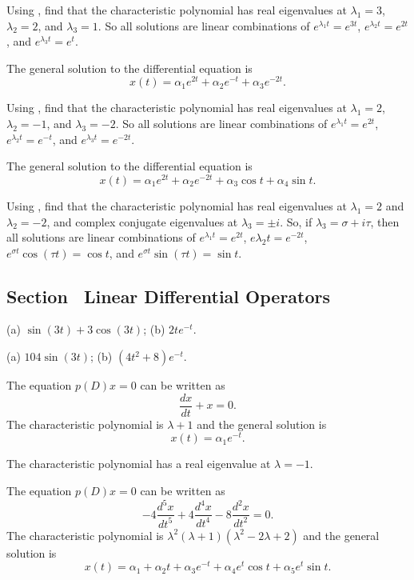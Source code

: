 \documentclass{ximera}
\begin{document}
\soln Using \Matlab, find that the characteristic polynomial has real
eigenvalues at $\lambda_1 = 3$, $\lambda_2 = 2$, and $\lambda_3 = 1$.  So
all solutions are linear combinations of $e^{\lambda_1 t} = e^{3t}$,
$e^{\lambda_2 t} = e^{2t}$, and $e^{\lambda_3 t} = e^t$.

 \ans The general solution to the differential equation is
\[
x(t) = \alpha_1e^{2t} + \alpha_2e^{-t} + \alpha_3e^{-2t}.
\]

\soln Using \Matlab, find that the characteristic polynomial has real
eigenvalues at $\lambda_1 = 2$, $\lambda_2 = -1$, and $\lambda_3 = -2$.  So
all solutions are linear combinations of $e^{\lambda_1 t} = e^{2t}$,
$e^{\lambda_2 t} = e^{-t}$, and $e^{\lambda_3 t} = e^{-2t}$.

\newpage
{} \ans The general solution to the differential equation is
\[
x(t) = \alpha_1e^{2t} + \alpha_2e^{-2t} + \alpha_3\cos t +
\alpha_4\sin t.
\]

\soln Using \Matlab, find that the characteristic polynomial has real
eigenvalues at $\lambda_1 = 2$ and $\lambda_2 = -2$, and complex
conjugate eigenvalues at $\lambda_3 = \pm i$.  So, if $\lambda_3 =
\sigma + i\tau$, then all solutions are linear combinations of
$e^{\lambda_1 t} = e^{2t}$, $e{\lambda_2 t} = e^{-2t}$,
$e^{\sigma t}\cos(\tau t) = \cos t$, and $e^{\sigma t}\sin(\tau t) = \sin t$.



\subsection*{Section~\protect{\ref{S:LDO}} Linear Differential Operators}

 \ans (a) $\sin(3t)+3\cos(3t)$; (b) $2te^{-t}$.

 \ans (a) $104\sin(3t)$; (b) $(4t^2+8)e^{-t}$.

 \ans The equation $p(D)x = 0$ can be written as
\[
\frac{dx}{dt} + x = 0.
\]
The characteristic polynomial is
$\lambda + 1$
and the general solution is
\[
x(t) = \alpha_1e^{-t}.
\]

\soln The characteristic polynomial has a real eigenvalue at $\lambda = -1$.

 \ans The equation $p(D)x = 0$ can be written as
\[
-4\frac{d^5x}{dt^5} + 4\frac{d^4x}{dt^4} - 8\frac{d^2x}{dt^2} = 0.
\]
The characteristic polynomial is
$\lambda^2(\lambda + 1)(\lambda^2 - 2\lambda + 2)$
and the general solution is
\[
x(t) = \alpha_1 + \alpha_2 t + \alpha_3e^{-t} +
\alpha_4e^t\cos t + \alpha_5e^t\sin t.
\]
\end{document}
